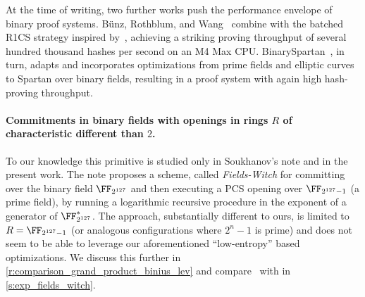 At the time of writing, two further works push the performance envelope of binary proof systems. Bünz, Rothblum, and Wang~\cite{flock} combine \cite{binius64} with the batched R1CS strategy inspired by~\cite{linearSizedIOPs}, achieving a striking proving throughput of several hundred thousand hashes per second on an M4 Max CPU. BinarySpartan~\cite{binaryspartan}, in turn, adapts and incorporates optimizations from prime fields and elliptic curves to  Spartan over binary fields, resulting in a proof system with again high hash-proving throughput.

\paragraph{Commitments in binary fields with openings in rings $R$ of characteristic different than $2$.} To our knowledge this primitive is studied only in Soukhanov's note \cite{lev} and in the present work. The note \cite{lev}  proposes a scheme, called \emph{Fields-Witch} for committing over the binary field $\FF_{2^{127}}$ and then executing a PCS opening over $\FF_{2^{127}-1}$ (a prime field), by running a logarithmic recursive procedure in  the exponent of a generator of   $\FF_{2^{127}}^*$. The approach, substantially different to ours, is limited to $R=\FF_{2^{127}-1}$ (or analogous configurations where $2^n-1$ is prime) and does not seem to be able to leverage our aforementioned ``low-entropy'' based optimizations.  We discuss this further in \cref{r:comparison_grand_product_binius_lev} and compare \ftwoz\ with \cite{lev} in \cref{s:exp_fields_witch}. %







